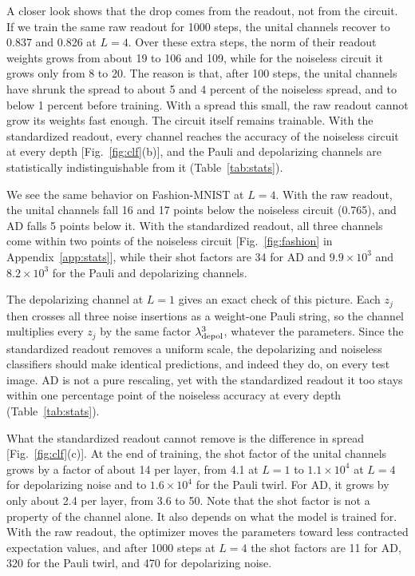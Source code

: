 \documentclass[
 aps,pra,
 twocolumn,
 superscriptaddress,
 longbibliography,
 nofootinbib
]{revtex4-2}
\begin{document}
A closer look shows that the drop comes from the readout, not from the
circuit. If we train the same raw readout for 1000 steps, the unital channels
recover to 0.837 and 0.826 at $L=4$. Over these extra steps, the norm of their
readout weights grows from about 19 to 106 and 109, while for the noiseless
circuit it grows only from 8 to 20. The reason is that, after 100 steps, the
unital channels have shrunk the spread to about 5 and 4 percent of the
noiseless spread, and to below 1 percent before training. With a spread this
small, the raw readout cannot grow its weights fast enough. The circuit itself
remains trainable. With the standardized readout, every channel reaches the
accuracy of the noiseless circuit at every depth [Fig.~\ref{fig:clf}(b)], and
the Pauli and depolarizing channels are statistically indistinguishable from it
(Table~\ref{tab:stats}).

We see the same behavior on Fashion-MNIST at $L=4$. With the raw readout, the
unital channels fall 16 and 17 points below the noiseless circuit (0.765), and
AD falls 5 points below it. With the standardized readout, all three channels
come within two points of the noiseless circuit [Fig.~\ref{fig:fashion} in
Appendix~\ref{app:stats}],
while their shot factors are 34 for AD and $9.9\times10^3$ and
$8.2\times10^3$ for the Pauli and depolarizing channels.

The depolarizing channel at $L=1$ gives an exact check of this picture. Each
$z_j$ then crosses all three noise insertions as a weight-one Pauli string,
so the channel multiplies every $z_j$ by the same factor
$\lambda_{\rm depol}^3$, whatever the parameters. Since the standardized
readout removes a uniform scale, the depolarizing and noiseless classifiers
should make identical predictions, and indeed they do, on every test image. AD
is not a pure rescaling, yet with the standardized readout it too stays within
one percentage point of the noiseless accuracy at every depth
(Table~\ref{tab:stats}).

What the standardized readout cannot remove is the difference in spread
[Fig.~\ref{fig:clf}(c)]. At the end of training, the shot factor of the unital
channels grows by a factor of about 14 per layer, from 4.1 at $L=1$ to
$1.1\times10^4$ at $L=4$ for depolarizing noise and to $1.6\times10^4$ for the
Pauli twirl. For AD, it grows by only about 2.4 per layer, from 3.6 to 50. Note
that the shot factor is not a property of the channel alone. It also depends on
what the model is trained for. With the raw readout, the optimizer moves the
parameters toward less contracted expectation values, and after 1000 steps at $L=4$ the
shot factors are 11 for AD, 320 for the Pauli twirl, and 470 for depolarizing
noise.
\end{document}

